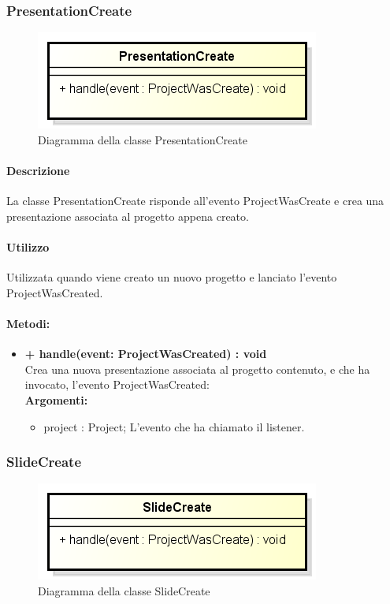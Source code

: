 \subsubsection{PresentationCreate}
\begin{figure}[h]
	\centering
	\includegraphics[width=0.5\linewidth]{img/premi_back_end_presentation_create}
	\caption[Diagramma della classe PresentationCreate]{Diagramma della classe PresentationCreate}
	\label{fig:premi_back_end_presentation_create}
\end{figure}


\paragraph{Descrizione}
La classe PresentationCreate risponde all'evento ProjectWasCreate e crea una presentazione associata al progetto appena creato.

\paragraph{Utilizzo}
Utilizzata quando viene creato un nuovo progetto e lanciato l'evento ProjectWasCreated.

\paragraph{Metodi:}
\begin{itemize}
	\item \textbf{+ handle(event: ProjectWasCreated) : void}\\
	Crea una nuova presentazione associata al progetto contenuto, e che ha invocato, l'evento ProjectWasCreated:\\
	\textbf{Argomenti:}
	\begin{itemize}
		\item project : Project;
		L'evento che ha chiamato il listener.
	\end{itemize}
\end{itemize}

\newpage
\subsubsection{SlideCreate}
\begin{figure}[h]
	\centering
	\includegraphics[width=0.5\linewidth]{img/premi_back_end_slide_create}
	\caption[Diagramma della classe SlideCreate]{Diagramma della classe SlideCreate}
	\label{fig:premi_back_end_slide_create}
\end{figure}



